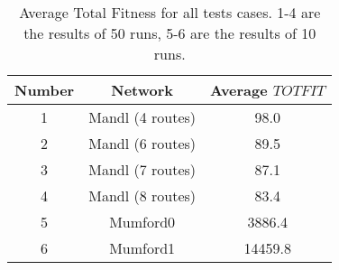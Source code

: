  

\begin{table}[H]
    \centering
    \hspace*{-1.0cm}
    \begin{tabular}{|c|c|c|}
        \hline
        \textbf{Number} & \textbf{Network} & \textbf{Average $TOTFIT$}\\
        \hline
        1 & Mandl (4 routes) & 98.0\\
        
        2 & Mandl (6 routes) & 89.5\\
        
        3 & Mandl (7 routes) & 87.1\\
        
        4 & Mandl (8 routes) & 83.4\\
        
        5 & Mumford0 & 3886.4\\
        
        6 & Mumford1 & 14459.8\\
        \hline
    \end{tabular}
    \caption{Average Total Fitness for all tests cases. 1-4 are the results of 50 runs, 5-6 are the results of 10 runs.}
    \label{tabel:averageTotfitAllTestCases}
\end{table}
 












